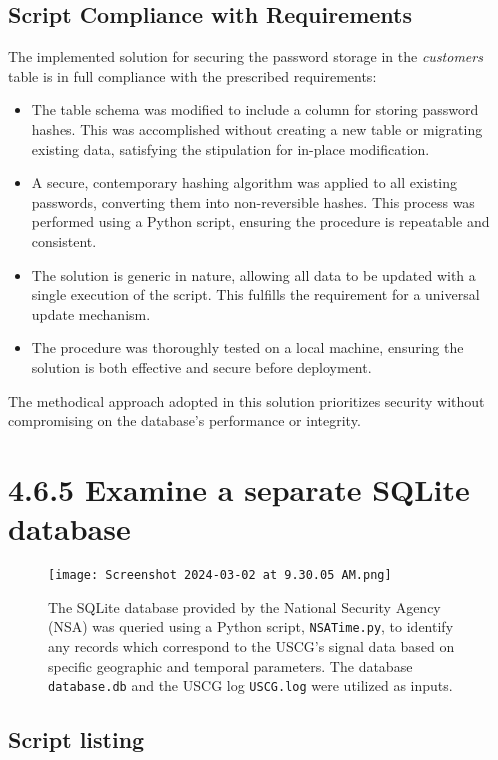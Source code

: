 \documentclass{article}
\begin{document}
\subsection*{Script Compliance with Requirements}
The implemented solution for securing the password storage in the \textit{customers} table is in full compliance with the prescribed requirements:
\begin{itemize}
    \item The table schema was modified to include a column for storing password hashes. This was accomplished without creating a new table or migrating existing data, satisfying the stipulation for in-place modification.
    \item A secure, contemporary hashing algorithm was applied to all existing passwords, converting them into non-reversible hashes. This process was performed using a Python script, ensuring  the procedure is repeatable and consistent.
    \item The solution is generic in nature, allowing all data to be updated with a single execution of the script. This fulfills the requirement for a universal update mechanism.
    \item The procedure was thoroughly tested on a local machine, ensuring the solution is both effective and secure before deployment.
\end{itemize}
The methodical approach adopted in this solution prioritizes security without compromising on the database's performance or integrity. 

\section*{4.6.5 Examine a separate SQLite database}

\begin{figure}[H]
    \centering
    \texttt{[image: Screenshot 2024-03-02 at 9.30.05 AM.png]}
    \caption{The SQLite database provided by the National Security Agency (NSA) was queried using a Python script, \texttt{NSATime.py}, to identify any records which correspond to the USCG's signal data based on specific geographic and temporal parameters. The database \texttt{database.db} and the USCG log \texttt{USCG.log} were utilized as inputs.}
\end{figure}

\subsection*{Script listing}


\end{document}
